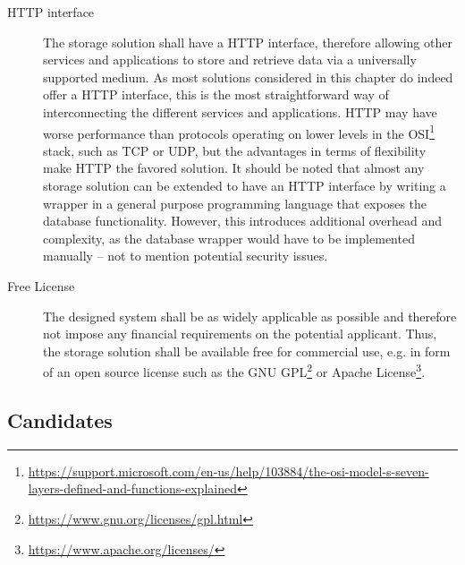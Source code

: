 \begin{description}
\item [HTTP interface]
The storage solution shall have a \ac{HTTP} interface, therefore allowing other services and applications to store and retrieve data via a universally supported medium.
As most solutions considered in this chapter do indeed offer a \ac{HTTP} interface, this is the most straightforward way of interconnecting the different services and applications.
\ac{HTTP} may have worse performance than protocols operating on lower levels in the \ac{OSI}\footnote{\url{https://support.microsoft.com/en-us/help/103884/the-osi-model-s-seven-layers-defined-and-functions-explained}} stack, such as \ac{TCP} or \ac{UDP}, but the advantages in terms of flexibility make \ac{HTTP} the favored solution.
It should be noted that almost any storage solution can be extended to have an \ac{HTTP} interface by writing a wrapper in a general purpose programming language that exposes the database functionality.
However, this introduces additional overhead and complexity, as the database wrapper would have to be implemented manually -- not to mention potential security issues.
\item [Free License]
The designed system shall be as widely applicable as possible and therefore not impose any financial requirements on the potential applicant.
Thus, the storage solution shall be available free for commercial use, e.g. in form of an open source license such as the GNU GPL\footnote{\url{https://www.gnu.org/licenses/gpl.html}} or Apache License\footnote{\url{https://www.apache.org/licenses/}}.
\end{description}


\subsection{Candidates}

